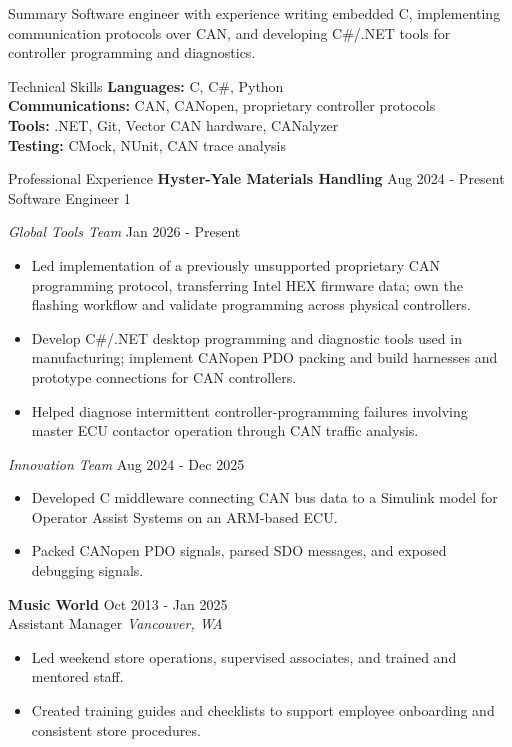 \documentclass{resume}
\begin{document}
\raggedright
\begin{rSection}{Summary}
Software engineer with experience writing embedded C, implementing communication protocols over CAN, and developing C\#/.NET tools for controller programming and diagnostics.
\end{rSection}

\begin{rSection}{Technical Skills}
\textbf{Languages:} C, C\#, Python \\
\textbf{Communications:} CAN, CANopen, proprietary controller protocols \\
\textbf{Tools:} .NET, Git, Vector CAN hardware, CANalyzer \\
\textbf{Testing:} CMock, NUnit, CAN trace analysis
\end{rSection}

\begin{rSection}{Professional Experience}
\textbf{Hyster-Yale Materials Handling} \hfill Aug 2024 - Present \\
Software Engineer 1

\textit{Global Tools Team} \hfill Jan 2026 - Present
\begin{itemize}\itemsep -3pt
\item Led implementation of a previously unsupported proprietary CAN programming protocol, transferring Intel HEX firmware data; own the flashing workflow and validate programming across physical controllers.
\item Develop C\#/.NET desktop programming and diagnostic tools used in manufacturing; implement CANopen PDO packing and build harnesses and prototype connections for CAN controllers.
\item Helped diagnose intermittent controller-programming failures involving master ECU contactor operation through CAN traffic analysis.
\end{itemize}

\textit{Innovation Team} \hfill Aug 2024 - Dec 2025
\begin{itemize}\itemsep -3pt
\item Developed C middleware connecting CAN bus data to a Simulink model for Operator Assist Systems on an ARM-based ECU.
\item Packed CANopen PDO signals, parsed SDO messages, and exposed debugging signals.
\end{itemize}

\textbf{Music World} \hfill Oct 2013 - Jan 2025 \\
Assistant Manager \hfill \textit{Vancouver, WA}
\begin{itemize}\itemsep -3pt
\item Led weekend store operations, supervised associates, and trained and mentored staff.
\item Created training guides and checklists to support employee onboarding and consistent store procedures.
\end{itemize}
\end{rSection}
\end{document}
